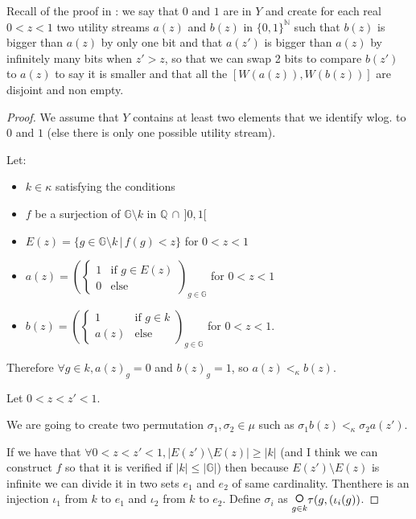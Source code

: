 \documentclass{article}
\begin{document}
Recall of the proof in \cite{basumitra03} : we say that $0$ and $1$ are in $Y$ and create for each real $0<z<1$ two utility streams $a(z)$ and $b(z)$ in $\{0,1\}^{\mathbb N}$ such that $b(z)$ is bigger than $a(z)$ by only one bit and that $a(z')$ is bigger than $a(z)$ by infinitely many bits when $z'>z$, so that we can swap 2 bits to compare $b(z')$ to $a(z)$ to say it is smaller and that all the $[W(a(z)),W(b(z))]$ are disjoint and non empty.

\begin{proof}
  We assume that $Y$ contains at least two elements that we identify wlog. to $0$ and $1$ (else there is only one possible utility stream).

  Let:
  \begin{itemize}
  \item $k\in\kappa$ satisfying the conditions
  \item $f$ be a surjection of $\mathbb G\setminus k$ in $\mathbb Q\,\cap\,]0,1[$
  \item $E(z)=\{g\in \mathbb G\setminus k\,|\, f(g)<z\}$ for $0<z<1$
  \item $\displaystyle a(z)=\left(\left\{\begin{array}{ll}1&\text{if }g\in E(z)\\0&\text{else}\end{array}\right.\right)_{g\in\mathbb G}$ for $0<z<1$
  \item $\displaystyle b(z)=\left(\left\{\begin{array}{ll}1&\text{if }g\in k\\a(z)&\text{else}\end{array}\right.\right)_{g\in\mathbb G}$ for $0<z<1$.
  \end{itemize}

  Therefore $\forall g\in k, a(z)_g=0$ and $b(z)_g=1$, so $a(z)<_\kappa b(z)$.

  Let $0<z<z'<1$.

  We are going to create two permutation $\sigma_1,\sigma_2\in\mu$ such as $\sigma_1 b(z)<_\kappa \sigma_2 a(z')$.

  If we have that $\forall 0<z<z'<1,|E(z')\setminus E(z)|\geq |k|$ (and I think we can construct $f$ so that it is verified if $|k|\leq|\mathbb G|$) then because $E(z')\setminus E(z)$ is infinite we can divide it in two sets $e_1$ and $e_2$ of same cardinality. Thenthere is an injection $\iota_1$ from $k$ to $e_1$ and $\iota_2$ from $k$ to $e_2$. Define $\sigma_i$ as $\underset{g\in k}{\text{\LARGE $\circ$}}\tau(g,(\iota_i(g))$.


\end{proof}
\end{document}
